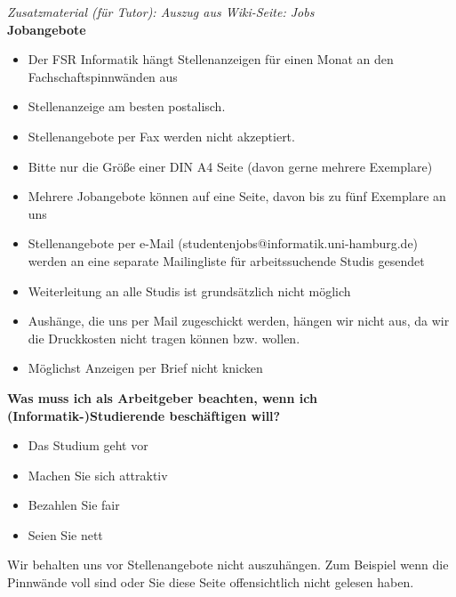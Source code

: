 \documentclass[a4paper,11pt]{scrartcl} %
\begin{document}
\begin{framed}
\textit{Zusatzmaterial (für Tutor): Auszug aus Wiki-Seite: Jobs} \\

\textbf{Jobangebote} \\
\begin{itemize}
\item Der FSR Informatik hängt Stellenanzeigen für einen Monat 
an den Fachschaftspinnwänden aus
\item Stellenanzeige am besten postalisch. 
\item Stellenangebote per Fax werden nicht akzeptiert. 
\item Bitte nur die Größe einer DIN A4 Seite (davon gerne mehrere Exemplare)
\item Mehrere Jobangebote können auf eine Seite, davon bis zu fünf Exemplare an uns
\item Stellenangebote per e-Mail (studentenjobs@informatik.uni-hamburg.de) 
werden an eine separate Mailingliste für arbeitssuchende Studis gesendet
\item Weiterleitung an alle Studis ist grundsätzlich nicht möglich
\item Aushänge, die uns per Mail zugeschickt werden, hängen wir nicht aus, da wir die 
Druckkosten nicht tragen können bzw. wollen.
\item Möglichst Anzeigen per Brief nicht knicken
\end{itemize}

\textbf{Was muss ich als Arbeitgeber beachten, wenn ich (Informatik-)Studierende beschäftigen will?}
\begin{itemize}
\item Das Studium geht vor
\item Machen Sie sich attraktiv
\item Bezahlen Sie fair
\item Seien Sie nett
\end{itemize}

Wir behalten uns vor Stellenangebote nicht auszuhängen. Zum Beispiel wenn die Pinnwände voll sind oder Sie diese Seite offensichtlich nicht gelesen haben. 
\end{framed}
\end{document}
